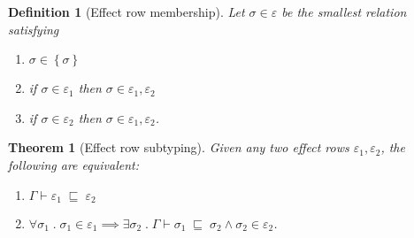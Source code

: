 \documentclass[12pt]{article}
\newtheorem{definition}{Definition}
\newtheorem{theorem}{Theorem}
\newcommand\type{\sigma}
\newcommand\row{\varepsilon}
\newcommand\rsingleton[1]{\left\{ #1 \right\}}
\newcommand\runion[2]{#1, #2}
\newcommand\context{\Gamma}
\newcommand\subsumes[3]{#1 \vdash #2 \; \sqsubseteq \; #3} %
\begin{document}
  \begin{definition}[Effect row membership]
    Let $\type \in \row$ be the smallest relation satisfying
    \begin{enumerate}
      \item $\type \in \rsingleton{\type}$
      \item if $\type \in \row_1$ then $\type \in \runion{\row_1}{\row_2}$
      \item if $\type \in \row_2$ then $\type \in \runion{\row_1}{\row_2}$.
    \end{enumerate}
  \end{definition}

  \begin{theorem}[Effect row subtyping]
    Given any two effect rows $\row_1, \row_2$, the following are equivalent:
    \begin{enumerate}
      \item $\subsumes{\context}{\row_1}{\row_2}$
      \item $\forall \type_1 \;.\; \type_1 \in \row_1 \implies \exists \type_2 \;.\; \subsumes{\context}{\type_1}{\type_2} \wedge \type_2 \in \row_2$.
    \end{enumerate}
  \end{theorem}
\end{document}
